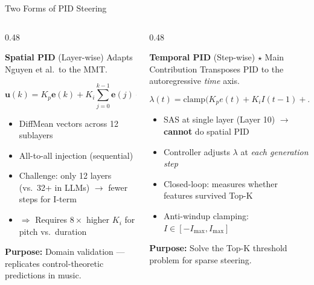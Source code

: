 \documentclass[aspectratio=169, 11pt]{beamer}
\begin{document}
\begin{frame}{Two Forms of PID Steering}

\begin{columns}[T]
\begin{column}{0.48\textwidth}
\begin{block}{\textbf{Spatial PID} (Layer-wise)}
\vspace{0.3em}
Adapts Nguyen et al.\ to the MMT.

$$\mathbf{u}(k) = K_p \mathbf{e}(k) + K_i \!\!\sum_{j=0}^{k-1}\!\mathbf{e}(j) + K_d \Delta\mathbf{e}(k)$$

\begin{itemize}
  \item DiffMean vectors across 12 sublayers
  \item All-to-all injection (sequential)
  \item Challenge: only 12 layers (vs.\ 32+ in LLMs) $\to$ fewer steps for I-term
  \item $\Rightarrow$ Requires $8\times$ higher $K_i$ for pitch vs.\ duration
\end{itemize}

\vspace{0.2em}
\textbf{Purpose:} Domain validation --- replicates control-theoretic predictions in music.
\end{block}
\end{column}

\begin{column}{0.48\textwidth}
\begin{block}{\textbf{Temporal PID} (Step-wise) \hfill {\color{alertred}$\star$ Main Contribution}}
\vspace{0.3em}
Transposes PID to the autoregressive \emph{time} axis.

$$\lambda(t) = \text{clamp}\!\Big(K_p e(t) + K_i I(t\!-\!1) + K_d \Delta e(t)\Big)$$

\begin{itemize}
  \item SAS at single layer (Layer 10) $\to$ \textbf{cannot} do spatial PID
  \item Controller adjusts $\lambda$ at \emph{each generation step}
  \item Closed-loop: measures whether features survived Top-K
  \item Anti-windup clamping: $I \in [-I_\text{max}, I_\text{max}]$
\end{itemize}

\vspace{0.2em}
\textbf{Purpose:} Solve the Top-K threshold problem for sparse steering.
\end{block}
\end{column}
\end{columns}


\end{frame}
\end{document}
